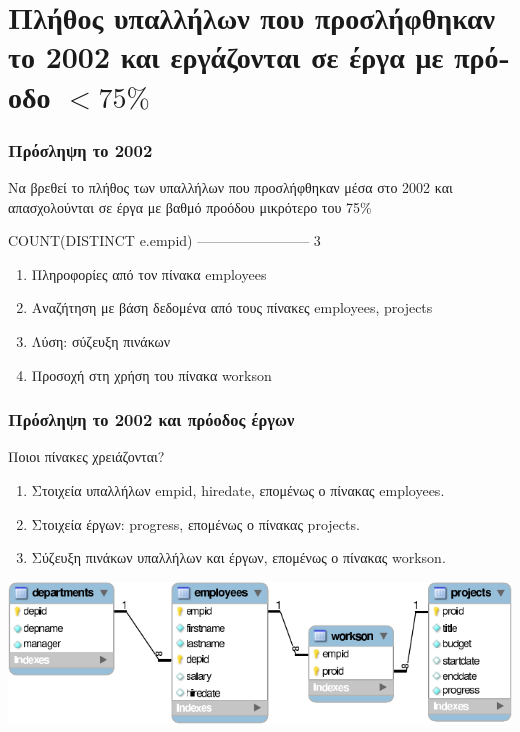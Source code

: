 
\section[]{\textgreek{Πλήθος υπαλλήλων που προσλήφθηκαν το 2002 και εργάζονται σε έργα με πρόοδο $<75\%$}}


\begin{frame}
\frametitle{Πρόσληψη το 2002}
\begin{block}{\small Να βρεθεί το πλήθος των υπαλλήλων που προσλήφθηκαν
μέσα στο 2002 και απασχολούνται σε έργα με βαθμό προόδου μικρότερο του 75\%}
\pause
\en
\begin{SQL}
 COUNT(DISTINCT e.empid)
------------------------
                       3
\end{SQL}
\el
\end{block}
\pause
\vspace{0.5cm}
\begin{minipage}{\wE}
\begin{enumerate} \itemsep 4pt
  \item Πληροφορίες από τον πίνακα {\ra employees}
  \item Αναζήτηση με βάση δεδομένα από τους πίνακες {\ra employees, projects}
  \item Λύση: {\crr σύζευξη πινάκων}
  \item {\crr Προσοχή} στη χρήση του πίνακα {\ra workson}
\end{enumerate}
\end{minipage}
\end{frame}


\begin{frame}
\frametitle{Πρόσληψη το 2002 και πρόοδος έργων}
\begin{minipage}{\wE}
  \vspace{-0.5cm}
  \begin{block}{Ποιοι πίνακες χρειάζονται?}
    \begin{enumerate} \itemsep 6pt
      \item Στοιχεία υπαλλήλων {\ra empid, hiredate}, επομένως ο πίνακας {\sq employees}.
      \item Στοιχεία έργων: {\ra progress}, επομένως ο πίνακας {\sq projects}.
      \item Σύζευξη πινάκων υπαλλήλων και έργων, επομένως ο πίνακας {\sq workson}.
    \end{enumerate}
  \end{block}
  \vspace{0.5cm}
  \includegraphics[scale=0.9]{../common/companyREL.pdf}
\end{minipage}
\end{frame}



